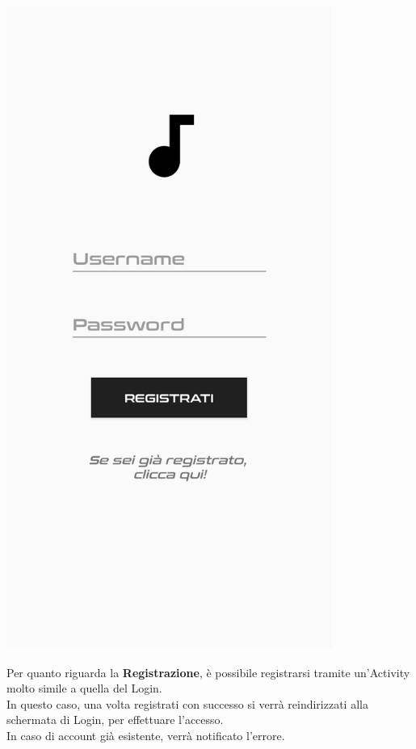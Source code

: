 \documentclass{article}
\begin{document}
\begin{minipage}[t]{0.35\textwidth}
    \centering
    \vspace*{0pt}
    \includegraphics[width=0.8\textwidth]{registrazione.png}
\end{minipage}
\hfill
\begin{minipage}[t]{0.6\textwidth}
    \raggedright
    \vspace*{10pt}
    Per quanto riguarda la \textbf{Registrazione}, è possibile registrarsi tramite un'Activity molto simile a quella del Login.\\
    In questo caso, una volta registrati con successo si verrà reindirizzati alla schermata di Login, per effettuare l'accesso.\\
    In caso di account già esistente, verrà notificato l'errore.
\end{minipage}
\end{document}
